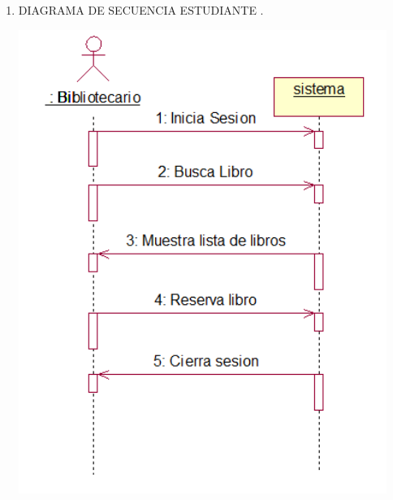 \begin{enumerate}[1.]
\newpage
	\item DIAGRAMA DE SECUENCIA ESTUDIANTE .\\
	\begin{center}
	\includegraphics[width=12cm]{./Imagenes/img5} 
	\end{center}
\end{enumerate} 
